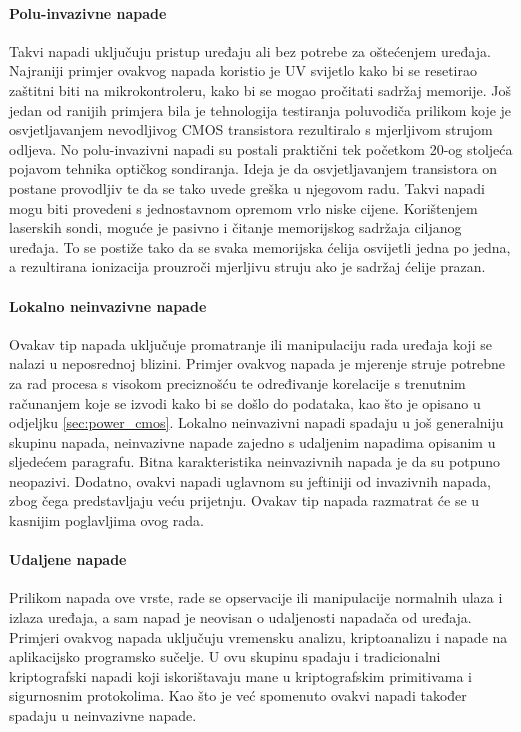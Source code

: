 \documentclass[times, utf8, diplomski]{fer}
\begin{document}
\paragraph{Polu-invazivne napade }
Takvi napadi uključuju pristup uređaju ali bez potrebe za oštećenjem uređaja. Najraniji primjer ovakvog napada koristio je UV svijetlo kako bi se resetirao zaštitni biti na mikrokontroleru, kako bi se mogao pročitati sadržaj memorije. Još jedan od ranijih primjera bila je tehnologija testiranja poluvodiča prilikom koje je osvjetljavanjem nevodljivog CMOS transistora rezultiralo s mjerljivom strujom odljeva. No polu-invazivni napadi su postali praktični tek početkom 20-og stoljeća pojavom tehnika optičkog sondiranja. Ideja je da osvjetljavanjem transistora on postane provodljiv te da se tako uvede greška u njegovom radu. Takvi napadi mogu biti provedeni s jednostavnom opremom vrlo niske cijene. Korištenjem laserskih sondi, moguće je pasivno i čitanje memorijskog sadržaja ciljanog uređaja. To se postiže tako da se svaka memorijska ćelija osvijetli jedna po jedna, a rezultirana ionizacija prouzroči mjerljivu struju ako je sadržaj ćelije prazan.

\paragraph{Lokalno neinvazivne napade } Ovakav tip napada uključuje promatranje ili manipulaciju rada uređaja koji se nalazi u neposrednoj blizini. Primjer ovakvog napada je mjerenje struje potrebne za rad procesa s visokom preciznošću te određivanje korelacije s trenutnim računanjem koje se izvodi kako bi se došlo do podataka, kao što je opisano u odjeljku \ref{sec:power_cmos}. Lokalno neinvazivni napadi spadaju u još generalniju skupinu napada, neinvazivne napade  zajedno s udaljenim napadima opisanim u sljedećem paragrafu. Bitna karakteristika neinvazivnih napada je da su potpuno neopazivi. Dodatno, ovakvi napadi uglavnom su jeftiniji od invazivnih napada, zbog čega predstavljaju veću prijetnju. Ovakav tip napada razmatrat će se u kasnijim poglavljima ovog rada.

\paragraph{Udaljene napade } Prilikom napada ove vrste, rade se opservacije ili manipulacije normalnih ulaza i izlaza uređaja, a sam napad je neovisan o udaljenosti napadača od uređaja. Primjeri ovakvog napada uključuju vremensku analizu, kriptoanalizu i napade na aplikacijsko programsko sučelje. U ovu skupinu spadaju i tradicionalni kriptografski napadi koji iskorištavaju mane u kriptografskim primitivama i sigurnosnim protokolima. Kao što je već spomenuto ovakvi napadi također spadaju u neinvazivne napade.
\end{document}
